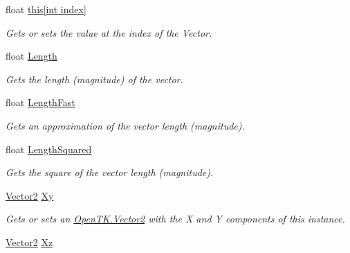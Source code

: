 \begin{DoxyCompactItemize}
\item 
float \hyperlink{struct_open_t_k_1_1_vector3_a8981d021599819438d96b7de1f1a2419}{this\mbox{[}int index\mbox{]}}
\begin{DoxyCompactList}\small\item\em Gets or sets the value at the index of the Vector. \end{DoxyCompactList}\item 
float \hyperlink{struct_open_t_k_1_1_vector3_a628fb895a38c0d423479e16a9309a64b}{Length}
\begin{DoxyCompactList}\small\item\em Gets the length (magnitude) of the vector. \end{DoxyCompactList}\item 
float \hyperlink{struct_open_t_k_1_1_vector3_ab76d7854a462ae971dc5b10947f34619}{Length\-Fast}
\begin{DoxyCompactList}\small\item\em Gets an approximation of the vector length (magnitude). \end{DoxyCompactList}\item 
float \hyperlink{struct_open_t_k_1_1_vector3_a160290ae46295484dfa7d564dce347f4}{Length\-Squared}
\begin{DoxyCompactList}\small\item\em Gets the square of the vector length (magnitude). \end{DoxyCompactList}\item 
\hyperlink{struct_open_t_k_1_1_vector2}{Vector2} \hyperlink{struct_open_t_k_1_1_vector3_a9ba609953357c0a84043b8917b7e93f1}{Xy}
\begin{DoxyCompactList}\small\item\em Gets or sets an \hyperlink{struct_open_t_k_1_1_vector2}{Open\-T\-K.\-Vector2} with the X and Y components of this instance. \end{DoxyCompactList}\item 
\hyperlink{struct_open_t_k_1_1_vector2}{Vector2} \hyperlink{struct_open_t_k_1_1_vector3_afa545fdfe354309cbce5785ff1ad3193}{Xz}

\end{DoxyCompactItemize}
